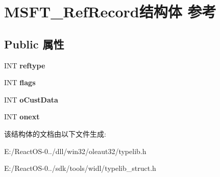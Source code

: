 \hypertarget{struct_m_s_f_t___ref_record}{}\section{M\+S\+F\+T\+\_\+\+Ref\+Record结构体 参考}
\label{struct_m_s_f_t___ref_record}
\subsection*{Public 属性}
\begin{DoxyCompactItemize}
\item 
\mbox{\label{struct_m_s_f_t___ref_record_affe5180f8b566d7924252a9246387c33}} 
I\+NT {\bfseries reftype}
\item 
\mbox{\label{struct_m_s_f_t___ref_record_a13627f12418801b06e3e8d6e98465a96}} 
I\+NT {\bfseries flags}
\item 
\mbox{\label{struct_m_s_f_t___ref_record_aa122b6160619d58d1ddd4a48baf58537}} 
I\+NT {\bfseries o\+Cust\+Data}
\item 
\mbox{\label{struct_m_s_f_t___ref_record_a8a9aaf1d0c47836e8ccc5d46dcadc37d}} 
I\+NT {\bfseries onext}
\end{DoxyCompactItemize}


该结构体的文档由以下文件生成\+:\begin{DoxyCompactItemize}
\item 
E\+:/\+React\+O\+S-\/0../dll/win32/oleaut32/typelib.\+h\item 
E\+:/\+React\+O\+S-\/0../sdk/tools/widl/typelib\+\_\+struct.\+h\end{DoxyCompactItemize}
